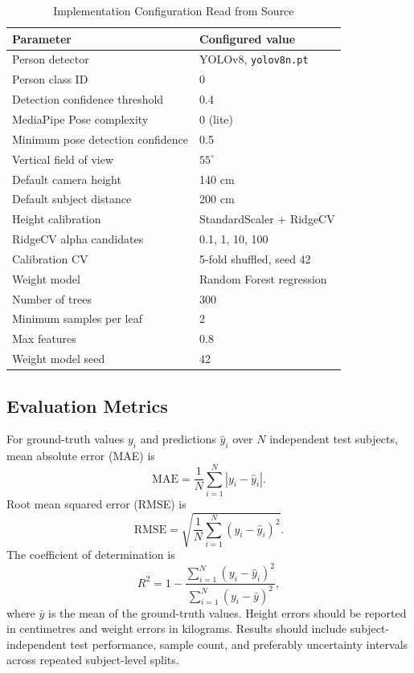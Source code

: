 \documentclass[conference]{IEEEtran}
\begin{document}
\begin{table}[t]
\caption{Implementation Configuration Read from Source}
\label{tab:config}
\centering
\footnotesize
\begin{tabular}{@{}p{}p{}@{}}
\toprule
\textbf{Parameter} & \textbf{Configured value}\\
\midrule
Person detector & YOLOv8, \texttt{yolov8n.pt}\\
Person class ID & 0\\
Detection confidence threshold & 0.4\\
MediaPipe Pose complexity & 0 (lite)\\
Minimum pose detection confidence & 0.5\\
Vertical field of view & $55^\circ$\\
Default camera height & 140 cm\\
Default subject distance & 200 cm\\
Height calibration & StandardScaler + RidgeCV\\
RidgeCV alpha candidates & 0.1, 1, 10, 100\\
Calibration CV & 5-fold shuffled, seed 42\\
Weight model & Random Forest regression\\
Number of trees & 300\\
Minimum samples per leaf & 2\\
Max features & 0.8\\
Weight model seed & 42\\
\bottomrule
\end{tabular}
\end{table}

\subsection{Evaluation Metrics}
For ground-truth values $y_i$ and predictions $\hat{y}_i$ over $N$ independent test subjects, mean absolute error (MAE) is
\begin{equation}
\mathrm{MAE}=\frac{1}{N}\sum_{i=1}^{N}|y_i-\hat{y}_i|.
\end{equation}
Root mean squared error (RMSE) is
\begin{equation}
\mathrm{RMSE}=\sqrt{\frac{1}{N}\sum_{i=1}^{N}(y_i-\hat{y}_i)^2}.
\end{equation}
The coefficient of determination is
\begin{equation}
R^2=1-\frac{\sum_{i=1}^{N}(y_i-\hat{y}_i)^2}
{\sum_{i=1}^{N}(y_i-\bar{y})^2},
\end{equation}
where $\bar{y}$ is the mean of the ground-truth values. Height errors should be reported in centimetres and weight errors in kilograms. Results should include subject-independent test performance, sample count, and preferably uncertainty intervals across repeated subject-level splits.
\end{document}

